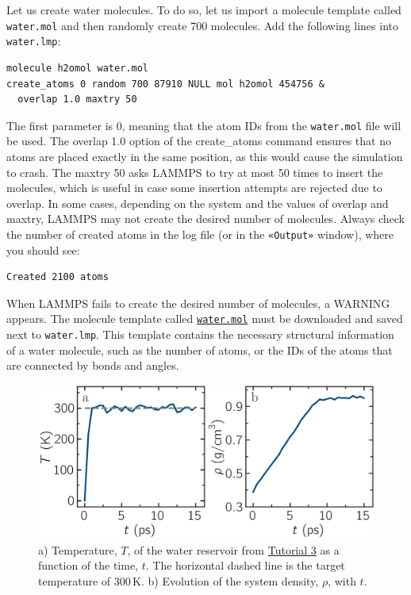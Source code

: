 \documentclass[9pt,tutorial]{livecoms}
\newcommand{\lmpcmd}[1]{\colorbox{listing}{\textcolor{command}{\small{#1}}}} %
\newcommand{\flecmd}[1]{\textcolor{command}{\texttt{#1}}} %
\newcommand{\guicmd}[1]{\textcolor{command}{\texttt{«#1»}}} %
\newcommand{\dwlcmd}[1]{\textcolor{download}{\texttt{#1}}} %
\newcommand{\filepath}{https://raw.githubusercontent.com/lammpstutorials/lammpstutorials-article/main/files/}
\begin{document}
Let us create water molecules.  To do so, let us import a molecule template called
\flecmd{water.mol} and then randomly create 700 molecules.  Add the following
lines into \flecmd{water.lmp}:
\begin{lstlisting}
molecule h2omol water.mol
create_atoms 0 random 700 87910 NULL mol h2omol 454756 &
  overlap 1.0 maxtry 50
\end{lstlisting}
{\color{blue}The first parameter is 0, meaning that the atom IDs from
the \flecmd{water.mol} file will be used.}
The \lmpcmd{overlap 1.0} option of the \lmpcmd{create\_atoms} command ensures
that no atoms are placed exactly in the same position, as this would cause the
simulation to crash.  The \lmpcmd{maxtry 50} asks LAMMPS to try at most 50 times
to insert the molecules, which is useful in case some insertion attempts are
rejected due to overlap.  In some cases, depending on the system and the values
of \lmpcmd{overlap} and \lmpcmd{maxtry}, LAMMPS may not create the desired number
of molecules.  Always check the number of created atoms in the \lmpcmd{log} file
(or in the \guicmd{Output} window), where you should see:
\begin{lstlisting}
Created 2100 atoms
\end{lstlisting}
When LAMMPS fails to create the desired number of molecules, a WARNING
appears.  The molecule template called
%
\href{\filepath tutorial3/water.mol}{\dwlcmd{water.mol}}
%
must be downloaded and saved
next to \flecmd{water.lmp}.  This template contains the necessary
structural information of a water molecule, such as the number of atoms,
or the IDs of the atoms that are connected by bonds and angles.

\begin{figure}
\centering
\includegraphics[width=\linewidth]{PEG-density}
\caption{a) Temperature, $T$, of the water reservoir from \hyperref[all-atom-label]{Tutorial 3}
as a function of the time, $t$.  The horizontal dashed line is the target temperature of 300\,K.
b) Evolution of the system density, $\rho$, with $t$.}
\label{fig:PEG-density}
\end{figure}
\end{document}
